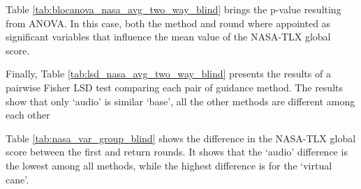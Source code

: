 Table \ref{tab:blocanova_nasa_avg_two_way_blind} brings the p-value resulting from ANOVA. In this case, both the method and round where appointed as significant variables that influence the mean value of the NASA-TLX global score. 



Finally, Table \ref{tab:lsd_nasa_avg_two_way_blind} presents the results of a pairwise Fisher LSD test comparing each pair of guidance method. The results show that only ‘audio’ is similar ‘base’, all the other methods are different among each other



Table \ref{tab:nasa_var_group_blind} shows the difference in the NASA-TLX global score between the first and return rounds. It shows that the ‘audio’ difference is the lowest among all methods, while the highest difference is for the ‘virtual cane’.





